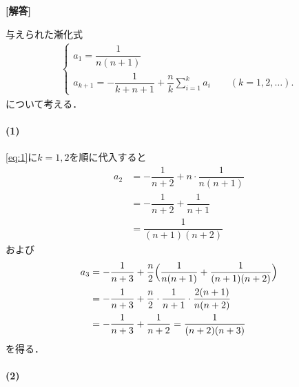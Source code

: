 \documentclass[../../main.tex]{subfiles}
\begin{document}
\begin{oframed}
  
\end{oframed}

{\bf [解答]}

与えられた漸化式
\begin{align}
  \begin{cases}
    a_1=\dfrac{1}{n(n+1)} \\
    a_{k+1}=-\dfrac{1}{k+n+1}+\dfrac{n}{k}\sum_{i=1}^ka_i\qquad(k=1,2,\dots).
  \end{cases} \label{eq:1}
\end{align}
について考える．

\paragraph{(1)}

\cref{eq:1}に$k=1,2$を順に代入すると
\begin{align}
  a_2
  &=-\dfrac{1}{n+2}+n\cdot\dfrac{1}{n(n+1)} \\
  &=-\dfrac{1}{n+2}+\dfrac{1}{n+1} \\
  &=\dfrac{1}{(n+1)(n+2)}
\end{align}
および
\begin{align}
  a_3
  &=-\dfrac{1}{n+3}+\dfrac{n}{2}\Bigl(\dfrac{1}{n(n+1)}+\dfrac{1}{(n+1)(n+2)}\Bigr) \\
  &=-\dfrac{1}{n+3}+\dfrac{n}{2}\cdot\dfrac{1}{n+1}\cdot\dfrac{2(n+1)}{n(n+2)} \\
  &=-\dfrac{1}{n+3}+\dfrac{1}{n+2}=\dfrac{1}{(n+2)(n+3)}
\end{align}
を得る．

\paragraph{(2)}
\end{document}
